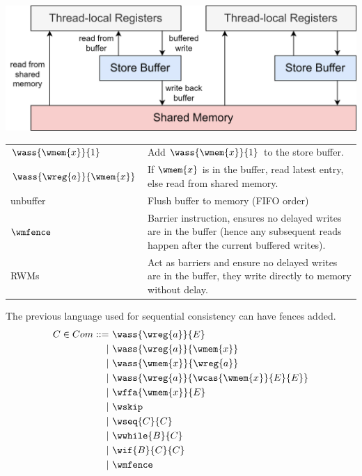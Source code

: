 \begin{center}
	\includegraphics[width=.8\textwidth]{operational_semantics/images/tso.drawio.png}
\end{center}
\begin{center}
	\begin{tabular}{l p{}}
		$\wass{\wmem{x}}{1}$        & Add $\wass{\wmem{x}}{1}$ to the store buffer.                                                                                           \\
		$\wass{\wreg{a}}{\wmem{x}}$ & If $\wmem{x}$ is in the buffer, read latest entry, else read from shared memory.                                                        \\
		unbuffer                    & Flush buffer to memory (FIFO order)                                                                                                     \\
		$\wmfence$                  & Barrier instruction, ensures no delayed writes are in the buffer (hence any subsequent reads happen after the current buffered writes). \\
		RWMs                        & Act as barriers and ensure no delayed writes are in the buffer, they write directly to memory without delay.                            \\
	\end{tabular}
\end{center}

The previous language used for sequential consistency can have fences added.
\[\begin{split}
		C \in Com ::= &\  \wass{\wreg{a}}{E} \\
		| & \  \wass{\wreg{a}}{\wmem{x}} \\
		| & \  \wass{\wmem{x}}{\wreg{a}} \\
		| & \  \wass{\wreg{a}}{\wcas{\wmem{x}}{E}{E}}\\
		| & \  \wffa{\wmem{x}}{E} \\
		| & \  \wskip \\
		| & \  \wseq{C}{C} \\
		| & \  \wwhile{B}{C} \\
		| & \  \wif{B}{C}{C} \\
		| & \  \wmfence \\
	\end{split}\]

